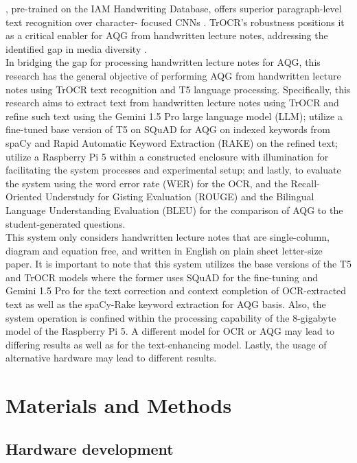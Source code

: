 \documentclass[conference]{IEEEtran}
\begin{document}
\cite{Li2021}, pre-trained on the IAM Handwriting Database, offers superior paragraph-level text recognition over character-
focused CNNs \cite{Mortadi2023}. TrOCR’s robustness positions it as a critical enabler for AQG from handwritten lecture notes, addressing the identified gap in media diversity \cite{Arbaaeen2020}. 
\\
\indent In bridging the gap for processing handwritten lecture notes for AQG, this research has the 
general objective of performing AQG from handwritten lecture
notes using TrOCR text recognition and T5 language processing.
Specifically, this research aims to extract text from
handwritten lecture notes using TrOCR and refine such text 
using the Gemini 1.5 Pro large language model (LLM); utilize 
a fine-tuned base version of T5 on SQuAD for AQG on 
indexed keywords from spaCy and Rapid Automatic Keyword 
Extraction (RAKE) on the refined text; utilize a Raspberry 
Pi 5 within a constructed enclosure with illumination 
for facilitating the system processes and experimental setup;
and lastly, to evaluate the system using the word error 
rate (WER) for the OCR, and the Recall-Oriented Understudy for 
Gisting Evaluation (ROUGE) and the Bilingual Language Understanding 
Evaluation (BLEU) for the comparison of AQG to the 
student-generated questions.
\\
\indent This system only considers handwritten lecture notes 
that are single-column, diagram and equation free, and written 
in English on plain sheet letter-size paper. It is important to note that 
this system utilizes the base versions of the T5 and TrOCR models where the 
former uses SQuAD for the fine-tuning and Gemini 1.5 Pro for the 
text correction and context completion of OCR-extracted text as well as 
the spaCy-Rake keyword extraction for AQG basis. Also, the system operation is confined 
within the processing capability of the 8-gigabyte model of the Raspberry Pi 5.
A different model for OCR or AQG may lead to differing results as well as 
for the text-enhancing model. Lastly, the usage of alternative hardware 
may lead to different results.
\section{Materials and Methods}
\subsection{Hardware development} 
\end{document}
